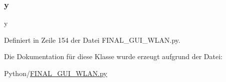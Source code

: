 \subsubsection{\texorpdfstring{y}{y}}
{\footnotesize\ttfamily y\hspace{0.3cm}{\ttfamily [static]}}



Definiert in Zeile 154 der Datei F\+I\+N\+A\+L\+\_\+\+G\+U\+I\+\_\+\+W\+L\+A\+N.\+py.



Die Dokumentation für diese Klasse wurde erzeugt aufgrund der Datei\+:\begin{DoxyCompactItemize}
\item 
Python/\hyperlink{_f_i_n_a_l___g_u_i___w_l_a_n_8py}{F\+I\+N\+A\+L\+\_\+\+G\+U\+I\+\_\+\+W\+L\+A\+N.\+py}\end{DoxyCompactItemize}
